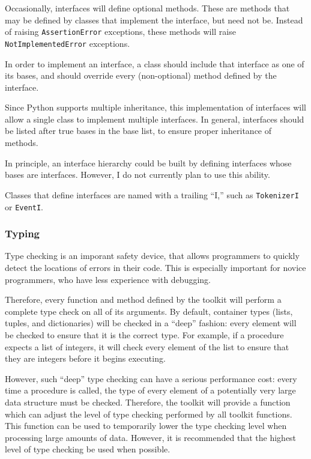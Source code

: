 \documentclass{article}
\begin{document}
Occasionally, interfaces will define optional methods.  These are
methods that may be defined by classes that implement the interface,
but need not be.  Instead of raising \texttt{AssertionError}
exceptions, these methods will raise \texttt{NotImplementedError}
exceptions. 

In order to implement an interface, a class should include that
interface as one of its bases, and should override every
(non-optional) method defined by the interface.

Since Python supports multiple inheritance, this implementation of
interfaces will allow a single class to implement multiple
interfaces.  In general, interfaces should be listed after true bases
in the base list, to ensure proper inheritance of methods.

In principle, an interface hierarchy could be built by defining
interfaces whose bases are interfaces.  However, I do not currently
plan to use this ability.

Classes that define interfaces are named with a trailing ``I,'' such
as \texttt{TokenizerI} or \texttt{EventI}.

\subsubsection{Typing}

Type checking is an imporant safety device, that allows programmers to
quickly detect the locations of errors in their code.  This is
especially important for novice programmers, who have less experience
with debugging.  

Therefore, every function and method defined by the toolkit will
perform a complete type check on all of its arguments.  By default,
container types (lists, tuples, and dictionaries) will be checked in a 
``deep'' fashion: every element will be checked to ensure that it is
the correct type.  For example, if a procedure expects a list of
integers, it will check every element of the list to ensure that they
are integers before it begins executing.  

However, such ``deep'' type checking can have a serious performance
cost: every time a procedure is called, the type of every element of a
potentially very large data structure must be checked.  Therefore, the 
toolkit will provide a function which can adjust the level of type
checking performed by all toolkit functions.  This function can be
used to temporarily lower the type checking level when processing
large amounts of data.  However, it is recommended that the highest
level of type checking be used when possible.
\end{document}
